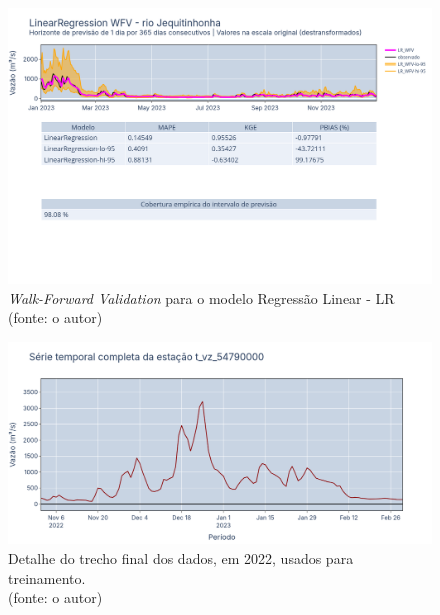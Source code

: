 \begin{figure}[!h]
	\centering
	\includegraphics[scale=0.33]{Figuras/jequiti/resultados/LR_WFV_LOG.png}
	\caption{\textit{Walk-Forward Validation} para o modelo Regressão Linear - LR\\(fonte: o autor)}
	\label{fig:jequiti_LR_WFV_LOG}
\end{figure}

\begin{figure}[!h]
	\centering
	\includegraphics[scale=0.33]{Figuras/jequiti/resultados/LR_final_2022_detalhe.png}
	\caption{Detalhe do trecho final dos dados, em 2022, usados para treinamento.\\(fonte: o autor)}
	\label{fig:jequiti_LR_final_2022_detalhe}
\end{figure}


